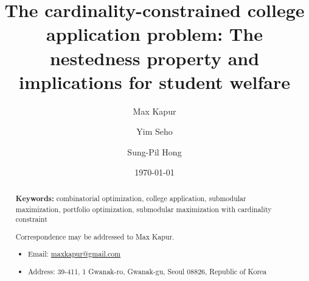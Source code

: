 \documentclass[11pt]{article} %
\title{The cardinality-constrained college application problem:
The nestedness property and implications for student welfare}
\author[1]{Max Kapur}
\author[2]{Yim Seho}
\author[3]{Sung-Pil Hong}
\affil[1,2,3]{Department of Industrial Engineering, Seoul National University}
\date{\today}
\theoremstyle{definition}
\begin{document}
\maketitle


\begin{abstract}



\textbf{Keywords:} combinatorial optimization, college application, submodular maximization, portfolio optimization, submodular maximization with cardinality constraint

\vfill
Correspondence may be addressed to Max Kapur.
\begin{itemize}

\item[] Email: \url{maxkapur@gmail.com}

\item[] Address: 39-411, 1 Gwanak-ro, Gwanak-gu, Seoul 08826, Republic of Korea
\end{itemize}

\end{abstract}


\pagebreak

\tableofcontents



\printbibliography
\end{document}
